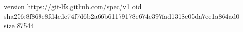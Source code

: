 version https://git-lfs.github.com/spec/v1
oid sha256:8f869e8fd4ede74f7d6b2a66b61179178e674e397fad1318e05da7ee1a864ad0
size 87544
